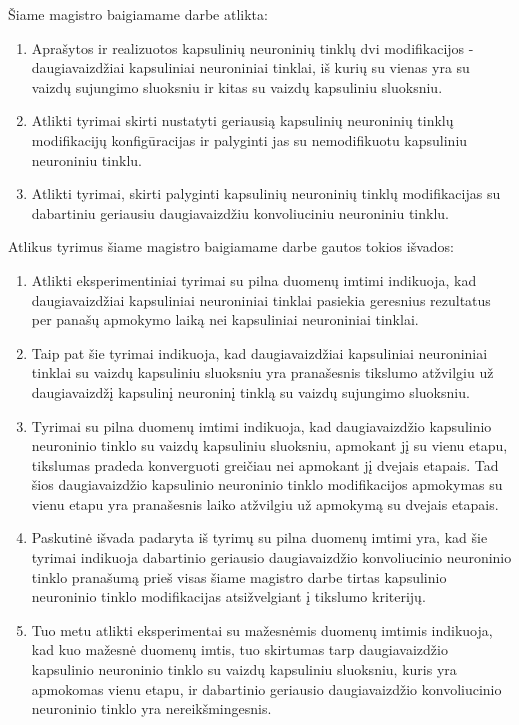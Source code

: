
Šiame magistro baigiamame darbe atlikta:

\begin{enumerate}
	\item Aprašytos ir realizuotos kapsulinių neuroninių tinklų dvi modifikacijos - daugiavaizdžiai kapsuliniai neuroniniai tinklai, iš kurių su vienas yra su vaizdų sujungimo sluoksniu ir kitas su vaizdų kapsuliniu sluoksniu.
	\item Atlikti tyrimai skirti nustatyti geriausią kapsulinių neuroninių tinklų modifikacijų konfigūracijas ir palyginti jas su nemodifikuotu kapsuliniu neuroniniu tinklu.
	\item Atlikti tyrimai, skirti palyginti kapsulinių neuroninių tinklų modifikacijas su dabartiniu geriausiu daugiavaizdžiu konvoliuciniu neuroniniu tinklu.
\end{enumerate}

Atlikus tyrimus šiame magistro baigiamame darbe gautos tokios išvados:

\begin{enumerate}
	\item Atlikti eksperimentiniai tyrimai su pilna duomenų imtimi indikuoja, kad daugiavaizdžiai kapsuliniai neuroniniai tinklai pasiekia geresnius rezultatus per panašų apmokymo laiką nei kapsuliniai neuroniniai tinklai.
	\item Taip pat šie tyrimai indikuoja, kad daugiavaizdžiai kapsuliniai neuroniniai tinklai su vaizdų kapsuliniu sluoksniu yra pranašesnis tikslumo atžvilgiu už daugiavaizdžį kapsulinį neuroninį tinklą su vaizdų sujungimo sluoksniu.
	\item Tyrimai su pilna duomenų imtimi indikuoja, kad daugiavaizdžio kapsulinio neuroninio tinklo su vaizdų kapsuliniu sluoksniu, apmokant jį su vienu etapu, tikslumas pradeda konverguoti greičiau nei apmokant jį dvejais etapais. Tad šios daugiavaizdžio kapsulinio neuroninio tinklo modifikacijos apmokymas su vienu etapu yra pranašesnis laiko atžvilgiu už apmokymą su dvejais etapais.
	\item Paskutinė išvada padaryta iš tyrimų su pilna duomenų imtimi yra, kad šie tyrimai indikuoja dabartinio geriausio daugiavaizdžio konvoliucinio neuroninio tinklo pranašumą prieš visas šiame magistro darbe tirtas kapsulinio neuroninio tinklo modifikacijas atsižvelgiant į tikslumo kriterijų.
	\item Tuo metu atlikti eksperimentai su mažesnėmis duomenų imtimis indikuoja, kad kuo mažesnė duomenų imtis, tuo skirtumas tarp daugiavaizdžio kapsulinio neuroninio tinklo su vaizdų kapsuliniu sluoksniu, kuris yra apmokomas vienu etapu, ir dabartinio geriausio daugiavaizdžio konvoliucinio neuroninio tinklo yra nereikšmingesnis.
\end{enumerate}

